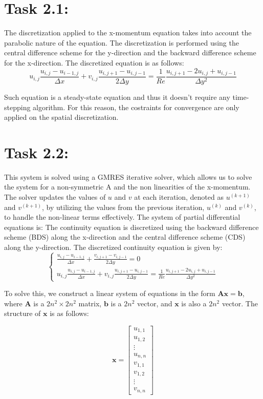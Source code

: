 \documentclass{article}
\begin{document}
\section*{\Large Task 2.1:}
The discretization applied to the x-momentum equation takes into account the parabolic nature of the equation. The discretization is performed using the central difference scheme for the y-direction and the backward difference scheme for the x-direction. The discretized equation is as follows:
\[
  u_{i,j}\frac{u_{i,j} - u_{i-1,j}}{\Delta x}  + v_{i,j} \frac{u_{i,j+1} - u_{i,j-1}}{2 \Delta y} = \frac{1}{Re} \frac{u_{i,j+1} - 2u_{i,j} + u_{i,j-1}}{\Delta y^2}
\]

Such equation is a steady-state equation and thus it doesn't require any time-stepping algorithm. 
For this reason, the costraints for convergence are only applied on the spatial discretization.
\section*{\Large Task 2.2:}
This system is solved using a GMRES iterative solver, which allows us to solve the system for a non-symmetric A and the non linearities of the x-momentum.
The solver updates the values of \( u \) and \( v \) at each iteration, denoted as \( u^{(k+1)} \) and \( v^{(k+1)} \), by utilizing the values from the previous iteration, \( u^{(k)} \) and \( v^{(k)} \), to handle the non-linear terms effectively.
The system of partial differential equations is:
The continuity equation is discretized using the backward difference scheme (BDS) along the x-direction and the central difference scheme (CDS) along the y-direction. The discretized continuity equation is given by:
\[
\begin{cases}
  \frac{u_{i,j} - u_{i-1,j}}{\Delta x} + \frac{v_{i,j+1} - v_{i,j-1}}{2 \Delta y} = 0 \\
  u_{i,j}\frac{u_{i,j} - u_{i-1,j}}{\Delta x}  + v_{i,j} \frac{u_{i,j+1} - u_{i,j-1}}{2 \Delta y} = \frac{1}{Re} \frac{u_{i,j+1} - 2u_{i,j} + u_{i,j-1}}{\Delta y^2}
\end{cases}
\]

To solve this, we construct a linear system of equations in the form \( \mathbf{A} \mathbf{x} = \mathbf{b} \), where \( \mathbf{A} \) is a \( 2n^2 \times 2n^2 \) matrix, \( \mathbf{b} \) is a \( 2n^2 \) vector, and \( \mathbf{x} \) is also a \( 2n^2 \) vector. The structure of \( \mathbf{x} \) is as follows:

\[
\mathbf{x} = \begin{bmatrix}
u_{1,1} \\
u_{1,2} \\
\vdots \\
u_{n,n} \\
v_{1,1} \\
v_{1,2} \\
\vdots \\
v_{n,n}
\end{bmatrix}
\]
\end{document}
